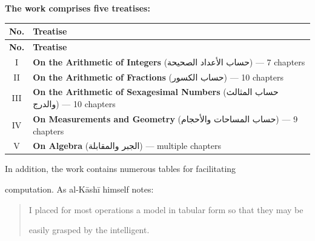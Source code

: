 \documentclass[11pt,a4paper]{article}
\newcommand{\ar}[1]{{\arabicfont\beginR #1\endR}}
\begin{document}
\vspace{0.5cm}



\noindent\textbf{The work comprises five treatises:}



\begin{longtable}{|c|p{10cm}|}

\hline

\textbf{No.} & \textbf{Treatise} \\

\hline

\endfirsthead

\hline

\textbf{No.} & \textbf{Treatise} \\

\hline

\endhead

I & \textbf{On the Arithmetic of Integers} (\ar{حساب الأعداد الصحيحة}) --- 7 chapters \\

\hline

II & \textbf{On the Arithmetic of Fractions} (\ar{حساب الكسور}) --- 10 chapters \\

\hline

III & \textbf{On the Arithmetic of Sexagesimal Numbers} (\ar{حساب المثالث والدرج}) --- 10 chapters \\

\hline

IV & \textbf{On Measurements and Geometry} (\ar{حساب المساحات والأحجام}) --- 9 chapters \\

\hline

V & \textbf{On Algebra} (\ar{الجبر والمقابلة}) --- multiple chapters \\

\hline

\end{longtable}



\noindent In addition, the work contains numerous tables for facilitating

computation. As al-K\=ash\=i himself notes:

\begin{quote}

I placed for most operations a model in tabular form so that they may be

easily grasped by the intelligent.

\end{quote}
\end{document}
